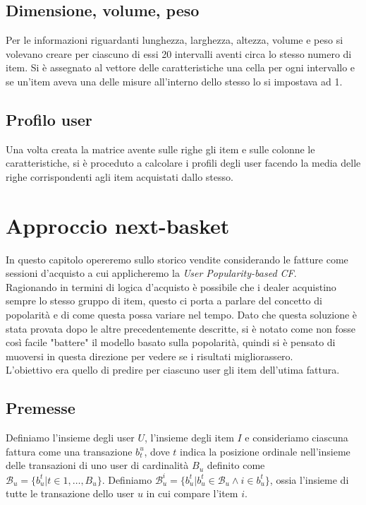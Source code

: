 \subsection{Dimensione, volume, peso}
Per le informazioni riguardanti lunghezza, larghezza, altezza, volume e peso si volevano creare per ciascuno di essi 20 intervalli aventi circa lo stesso numero di item. Si è assegnato al vettore delle caratteristiche una cella per ogni intervallo e se un'item aveva una delle misure all'interno dello stesso lo si impostava ad 1.

\subsection{Profilo user}
Una volta creata la matrice avente sulle righe gli item e sulle colonne le caratteristiche, si è proceduto a calcolare i profili degli user facendo la media delle righe corrispondenti agli item acquistati dallo stesso.

\section{Approccio next-basket}
In questo capitolo opereremo sullo storico vendite considerando le fatture come sessioni d'acquisto a cui applicheremo la \textit{User Popularity-based CF}.\\
Ragionando in termini di logica d'acquisto è possibile che i dealer acquistino sempre lo stesso gruppo di item, questo ci porta a parlare del concetto di popolarità e di come questa possa variare nel tempo.
Dato che questa soluzione è stata provata dopo le altre precedentemente descritte, si è notato come non fosse così facile "battere" il modello basato sulla popolarità, quindi si è pensato di muoversi in questa direzione per vedere se i risultati migliorassero.\\
L'obiettivo era quello di predire per ciascuno user gli item dell'utima fattura.

\subsection{Premesse}
Definiamo l'insieme degli user $U$, l'insieme degli item $I$ e consideriamo ciascuna fattura come una transazione $b_{t}^{u}$, dove $t$ indica la posizione ordinale nell'insieme delle transazioni di uno user di cardinalità $B_{u}$ definito come $\mathcal{B}_u = \{b_{u}^{t} | t \in 1, \dots, B_u\}$. Definiamo $\mathcal{B}_{u}^{i} = \{b_{u}^{t}|b_{u}^{t} \in \mathcal{B}_{u} \wedge i \in b_{u}^{t}\}$, ossia l'insieme di tutte le transazione dello user $u$ in cui compare l'item $i$.
